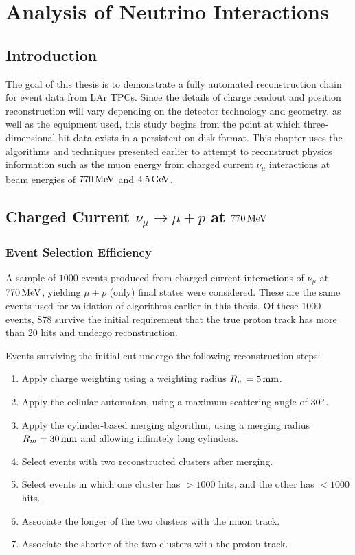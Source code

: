 \chapter{Analysis of Neutrino Interactions}\label{chapter:Analysis}
\section{Introduction}
The goal of this thesis is to demonstrate a fully automated reconstruction chain for event data from \ac{LAr TPC}s. Since the details of charge readout and position reconstruction will vary depending on the detector technology and geometry, as well as the equipment used, this study begins from the point at which three-dimensional hit data exists in a persistent on-disk format. This chapter uses the algorithms and techniques presented earlier to attempt to reconstruct physics information such as the muon energy from charged current $\nu_\mu$ interactions at beam energies of $770\,\mathrm{MeV}$ and $4.5\,\mathrm{GeV}$.

\section{Charged Current $\nu_\mu \rightarrow \mu + p$ at $770\,\mathrm{MeV}$}
\subsection{Event Selection Efficiency}
A sample of $1000$ events produced from charged current interactions of $\nu_\mu$ at $770\,\mathrm{MeV}$, yielding $\mu + p$ (only) final states were considered. These are the same events used for validation of algorithms earlier in this thesis. Of these 1000 events, 878 survive the initial requirement that the true proton track has more than 20 hits and undergo reconstruction. 

Events surviving the initial cut undergo the following reconstruction steps:
\begin{enumerate}
    \item Apply charge weighting using a weighting radius $R_w=5\,\mathrm{mm}$.
    \item Apply the cellular automaton, using a maximum scattering angle of $30^\circ$.
    \item Apply the cylinder-based merging algorithm, using a merging radius $R_m=30\,\mathrm{mm}$ and allowing infinitely long cylinders.
    \item Select events with two reconstructed clusters after merging.
    \item Select events in which one cluster has $> 1000$ hits, and the other has $< 1000$ hits.
    \item Associate the longer of the two clusters with the muon track.
    \item Associate the shorter of the two clusters with the proton track.
\end{enumerate}

